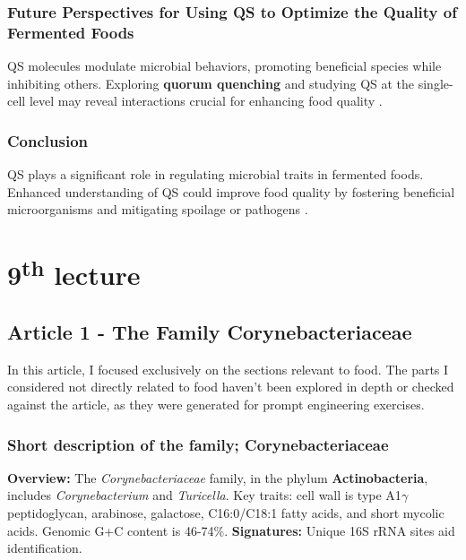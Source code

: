 \subsubsection*{Future Perspectives for Using QS to Optimize the Quality of Fermented Foods}
QS molecules modulate microbial behaviors, promoting beneficial species while inhibiting others. Exploring \textbf{quorum quenching} and studying QS at the single-cell level may reveal interactions crucial for enhancing food quality \cite*{L8-ImpQuorum}.

\subsubsection*{Conclusion}
QS plays a significant role in regulating microbial traits in fermented foods. Enhanced understanding of QS could improve food quality by fostering beneficial microorganisms and mitigating spoilage or pathogens \cite*{L8-ImpQuorum}.

\section{9\texorpdfstring{\textsuperscript{th}}{th} lecture}
\subsection{Article 1 - The Family Corynebacteriaceae}
In this article, I focused exclusively on the sections relevant to food. The parts I considered not directly related to food haven't been explored in depth or checked against the article, as they were generated for prompt engineering exercises.
\subsubsection*{Short description of the family; Corynebacteriaceae}
\textbf{Overview:} The \textit{Corynebacteriaceae} family, in the phylum \textbf{Actinobacteria}, includes \textit{Corynebacterium} and \textit{Turicella}. Key traits: cell wall is type A1$\gamma$ peptidoglycan, arabinose, galactose, C16:0/C18:1 fatty acids, and short mycolic acids. Genomic G+C content is 46-74\%. \textbf{Signatures:} Unique 16S rRNA sites aid identification.

